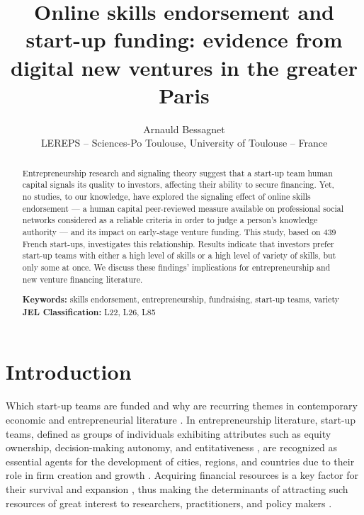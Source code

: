 \documentclass[12pt]{article}
\begin{document}
\title{Online skills endorsement and start-up funding: evidence from digital new ventures in the greater Paris}
\date{\vspace{-3ex}}
\author{Arnauld Bessagnet \\ \footnotesize{LEREPS – Sciences-Po Toulouse, University of Toulouse – France} \\}

\maketitle \vspace{-1,5em}

\begin{abstract}
\noindent
Entrepreneurship research and signaling theory suggest that a start-up team human capital signals its quality to investors, affecting their ability to secure financing. Yet, no studies, to our knowledge, have explored the signaling effect of online skills endorsement — a human capital peer-reviewed measure available on professional social networks considered as a reliable criteria in order to judge a person’s knowledge authority — and its impact on early-stage venture funding. This study, based on 439 French start-ups, investigates this relationship. Results indicate that investors prefer start-up teams with either a high level of skills or a high level of variety of skills, but only some at once. We discuss these findings' implications for entrepreneurship and new venture financing literature. \newline

\begin{obeylines}
\noindent \footnotesize{}{\textbf{Keywords:} skills endorsement, entrepreneurship, fundraising, start-up teams, variety}
\noindent \footnotesize{\textbf{JEL Classification:} L22, L26, L85}
\end{obeylines}

\end{abstract}

\clearpage
\section{Introduction}

Which start-up teams are funded and why are recurring themes in contemporary economic and entrepreneurial literature \citep{baum2004picking, beckman2007early, bernstein2017attracting, franke2006you, franke2008venture, kaplan2009should, plummer2016better, shane2002network}. In entrepreneurship literature, start-up teams, defined as groups of individuals exhibiting attributes such as equity ownership, decision-making autonomy, and entitativeness \citep{knight2020start}, are recognized as essential agents for the development of cities, regions, and countries due to their role in firm creation and growth \citep{audretsch2001linking, autio2016entrepreneurship}. Acquiring financial resources is a key factor for their survival and expansion \citep{rosenbusch2013does}, thus making the determinants of attracting such resources of great interest to researchers, practitioners, and policy makers \citep{EUcommission2015digital}.
\end{document}
